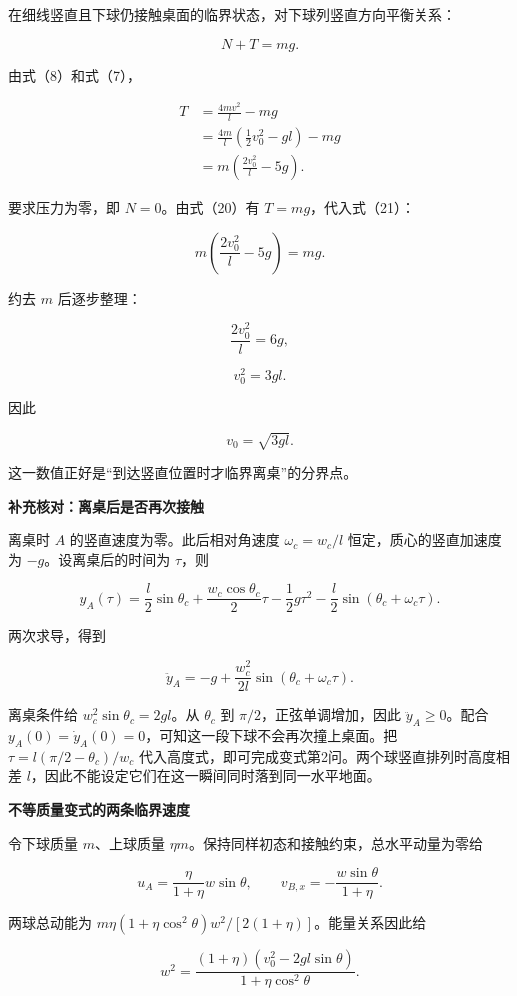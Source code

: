\documentclass[12pt,a4paper,UTF8]{ctexart}
\begin{document}
在细线竖直且下球仍接触桌面的临界状态，对下球列竖直方向平衡关系：

\[
N+T=mg.
\tag{20}
\]

由式（8）和式（7），

\[
\begin{aligned}
T
&=\frac{4mv^2}{l}-mg\\
&=\frac{4m}{l}\left(\frac12v_0^2-gl\right)-mg\\
&=m\left(\frac{2v_0^2}{l}-5g\right).
\end{aligned}
\tag{21}
\]

要求压力为零，即 \(N=0\)。由式（20）有 \(T=mg\)，代入式（21）：

\[
m\left(\frac{2v_0^2}{l}-5g\right)=mg.
\]

约去 \(m\) 后逐步整理：

\[
\frac{2v_0^2}{l}=6g,
\]

\[
v_0^2=3gl.
\]

因此

\[
\boxed{v_0=\sqrt{3gl}}.
\tag{22}
\]

这一数值正好是``到达竖直位置时才临界离桌''的分界点。

\textbf{补充核对：离桌后是否再次接触}

离桌时 \(A\) 的竖直速度为零。此后相对角速度 \(\omega_c=w_c/l\)
恒定，质心的竖直加速度为 \(-g\)。设离桌后的时间为 \(\tau\)，则

\[y_A(\tau)=\frac l2\sin\theta_c+\frac{w_c\cos\theta_c}{2}\tau-\frac12g\tau^2-\frac l2\sin(\theta_c+\omega_c\tau).\]

两次求导，得到

\[\ddot y_A=-g+\frac{w_c^2}{2l}\sin(\theta_c+\omega_c\tau).\]

离桌条件给 \(w_c^2\sin\theta_c=2gl\)。从 \(\theta_c\) 到
\(\pi/2\)，正弦单调增加，因此 \(\ddot y_A\ge0\)。配合
\(y_A(0)=\dot y_A(0)=0\)，可知这一段下球不会再次撞上桌面。把
\(\tau=l(\pi/2-\theta_c)/w_c\)
代入高度式，即可完成变式第2问。两个球竖直排列时高度相差
\(l\)，因此不能设定它们在这一瞬间同时落到同一水平地面。

\textbf{不等质量变式的两条临界速度}

令下球质量 \(m\)、上球质量
\(\eta m\)。保持同样初态和接触约束，总水平动量为零给

\[u_A=\frac{\eta}{1+\eta}w\sin\theta,\qquad v_{B,x}=-\frac{w\sin\theta}{1+\eta}.\]

两球总动能为
\(m\eta(1+\eta\cos^2\theta)w^2/[2(1+\eta)]\)。能量关系因此给

\[w^2=\frac{(1+\eta)(v_0^2-2gl\sin\theta)}{1+\eta\cos^2\theta}.\]
\end{document}
